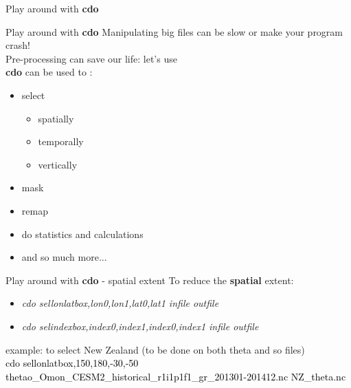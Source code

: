  
\begin{frame}{\insertsectionnumber{ |} Play around with \textbf{cdo}}
\end{frame} 


\begin{frame}{\insertsectionnumber{ |} Play around with \textbf{cdo}}
    Manipulating big files can be slow or make your program crash!\\
        \vspace{0.3cm}
    Pre-processing can save our life: let's use \href{http://www.idris.fr/media/ada/cdo.pdf}{}\\
        \vspace{0.5cm}
    \textbf{cdo} can be used to :
        \vspace{0.3cm}
    \begin{itemize}
        \item select
            \vspace{0.1cm}
            \begin{itemize}
                \item spatially
                    \vspace{0.1cm}
                \item temporally
                    \vspace{0.1cm}
                \item vertically
            \end{itemize}
        \item mask
        \item remap
        \item do statistics and calculations
        \item and so much more...
    \end{itemize}
\end{frame}     
        
\begin{frame}{\insertsectionnumber{ |} Play around with \textbf{cdo} - spatial extent}        
    To reduce the \textbf{spatial} extent:
    \vspace{0.3cm}
    \begin{itemize}
        \item \textit{cdo sellonlatbox,lon0,lon1,lat0,lat1 infile outfile }
           \vspace{0.3cm}
        \item \textit{cdo selindexbox,index0,index1,index0,index1 infile outfile }
    \end{itemize}
        \vspace{0.5cm}
    example: to select New Zealand (to be done on both theta and so files)\\
        \vspace{0.3cm}
    \textcolor{black}{cdo sellonlatbox,150,180,-30,-50 thetao\_Omon\_CESM2\_historical\_r1i1p1f1\_gr\_201301-201412.nc NZ\_theta.nc }\\
        \vspace{0.3cm}
\end{frame}
  
